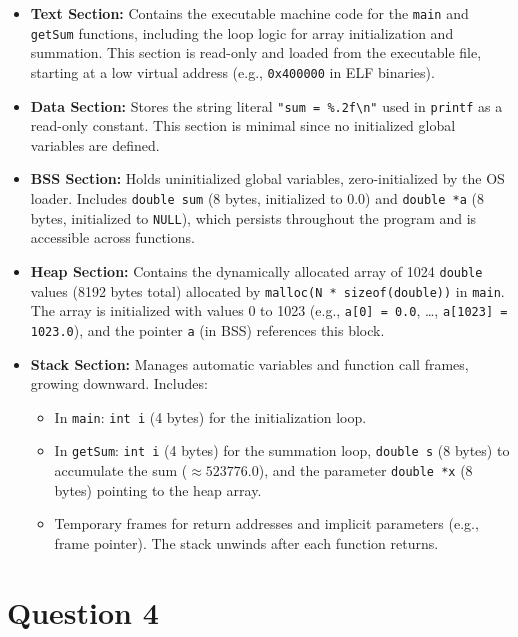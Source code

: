\documentclass[../main.tex]{subfiles}
\begin{document}
\begin{itemize}
    \item \textbf{Text Section:} Contains the executable machine code for the \texttt{main} and \texttt{getSum} functions, including the loop logic for array initialization and summation. This section is read-only and loaded from the executable file, starting at a low virtual address (e.g., \texttt{0x400000} in ELF binaries).
    
    \item \textbf{Data Section:} Stores the string literal \texttt{"sum = \%.2f\textbackslash n"} used in \texttt{printf} as a read-only constant. This section is minimal since no initialized global variables are defined.
    
    \item \textbf{BSS Section:} Holds uninitialized global variables, zero-initialized by the OS loader. Includes \texttt{double sum} (8 bytes, initialized to 0.0) and \texttt{double *a} (8 bytes, initialized to \texttt{NULL}), which persists throughout the program and is accessible across functions.
    
    \item \textbf{Heap Section:} Contains the dynamically allocated array of 1024 \texttt{double} values (8192 bytes total) allocated by \texttt{malloc(N * sizeof(double))} in \texttt{main}. The array is initialized with values 0 to 1023 (e.g., \texttt{a[0] = 0.0}, \ldots, \texttt{a[1023] = 1023.0}), and the pointer \texttt{a} (in BSS) references this block.
    
    \item \textbf{Stack Section:} Manages automatic variables and function call frames, growing downward. Includes:
    \begin{itemize}
        \item In \texttt{main}: \texttt{int i} (4 bytes) for the initialization loop.
        \item In \texttt{getSum}: \texttt{int i} (4 bytes) for the summation loop, \texttt{double s} (8 bytes) to accumulate the sum ($\approx 523776.0$), and the parameter \texttt{double *x} (8 bytes) pointing to the heap array.
        \item Temporary frames for return addresses and implicit parameters (e.g., frame pointer). The stack unwinds after each function returns.
    \end{itemize}
\end{itemize}

\newpage
\section{Question 4}
\end{document}
